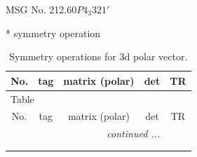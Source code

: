 \documentclass[fleqn,8pt]{jsarticle}
\begin{document}
\setcounter{MaxMatrixCols}{32}

\renewcommand{\tablename}{Table~}
\renewcommand{\figurename}{Figure~}
\begin{center}
\LARGE
MSG No. 212.60\quad$P4_{3}321'$
\end{center}
* symmetry operation
\renewcommand{\arraystretch}{1.3}
\begin{longtable}{ccccc}
\caption{Symmetry operations for 3d polar vector.}
 \\
 \hline \hline
No. & tag & matrix (polar) & det & TR \\ \hline \endfirsthead

\multicolumn{4}{l}{\tablename\ \thetable{}} \\
 \hline \hline
No. & tag & matrix (polar) & det & TR \\ \hline \endhead

 \hline \hline
\multicolumn{4}{r}{\footnotesize\it continued ...} \\ \endfoot

 \hline \hline
\multicolumn{4}{r}{} \\ \endlastfoot


\end{longtable}
\end{document}
